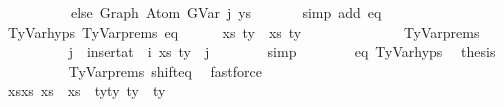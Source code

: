 \begin{isabellebody}
\ \ \ \ \ \ \ \ \ \ else\ Graph\ {\isacharparenleft}{\kern0pt}Atom\ {\isacharparenleft}{\kern0pt}GVar\ j{\isacharparenright}{\kern0pt}\ ys{\isacharparenright}{\kern0pt}{\isacharparenright}{\kern0pt}{\isachardoublequoteclose}\isanewline
\ \ \ \ \ \isamarkupfalse%
\ {\isacharparenleft}{\kern0pt}simp\ add{\isacharcolon}{\kern0pt}\ eq{\isacharparenright}{\kern0pt}\isanewline
\isanewline
\ \ \ \ \isamarkupfalse%
\ TyVar{\isachardot}{\kern0pt}hyps{\isacharparenleft}{\kern0pt}{}{\isacharparenright}{\kern0pt}\ TyVar{\isachardot}{\kern0pt}prems{\isacharparenleft}{\kern0pt}{}{\isacharparenright}{\kern0pt}\ eq\isanewline
\ \ \ \ \isamarkupfalse%
\ {\isachardoublequoteopen}{\isacharparenleft}{\kern0pt}xs{\isacharprime}{\kern0pt}{\isacharcomma}{\kern0pt}\ ty{\isacharprime}{\kern0pt}{\isacharparenright}{\kern0pt}\ {\isacharequal}{\kern0pt}\ {\isacharparenleft}{\kern0pt}xs{\isacharcomma}{\kern0pt}\ ty{}{\isacharparenright}{\kern0pt}{\isachardoublequoteclose}\isanewline
\ \ \ \ \isamarkupfalse%
\ {\isacharminus}{\kern0pt}\isanewline
\ \ \ \ \ \ \isamarkupfalse%
\ TyVar{\isachardot}{\kern0pt}prems{\isacharparenleft}{\kern0pt}{}{\isacharparenright}{\kern0pt}\isanewline
\ \ \ \ \ \ \isamarkupfalse%
\ {\isachardoublequoteopen}{\isasymGamma}\ {\isacharbang}{\kern0pt}\ j\ {\isacharequal}{\kern0pt}\ {\isacharparenleft}{\kern0pt}insert{\isacharunderscore}{\kern0pt}at\ {\isasymGamma}{}\ i\ {\isacharparenleft}{\kern0pt}xs{\isacharcomma}{\kern0pt}\ ty{}{\isacharparenright}{\kern0pt}{\isacharparenright}{\kern0pt}\ {\isacharbang}{\kern0pt}\ j{\isachardoublequoteclose}\isanewline
\ \ \ \ \ \ \isamarkupfalse%
\ simp\isanewline
\ \ \ \ \ \ \isamarkupfalse%
\ eq\ TyVar{\isachardot}{\kern0pt}hyps{\isacharparenleft}{\kern0pt}{}{\isacharparenright}{\kern0pt}\ \isamarkupfalse%
\ {\isacharquery}{\kern0pt}thesis\isanewline
\ \ \ \ \ \ \ \ \isamarkupfalse%
\ TyVar{\isachardot}{\kern0pt}prems{\isacharparenleft}{\kern0pt}{}{\isacharparenright}{\kern0pt}\ shift{\isacharunderscore}{\kern0pt}eq\ \isamarkupfalse%
\ fastforce\isanewline
\ \ \ \ \isamarkupfalse%
\isanewline
\ \ \ \ \isamarkupfalse%
\ \isamarkupfalse%
\ xs{\isacharprime}{\kern0pt}{\isacharunderscore}{\kern0pt}xs{\isacharcolon}{\kern0pt}\ {\isachardoublequoteopen}xs{\isacharprime}{\kern0pt}\ {\isacharequal}{\kern0pt}\ xs{\isachardoublequoteclose}\ \ ty{\isacharprime}{\kern0pt}{\isacharunderscore}{\kern0pt}ty{}{\isacharcolon}{\kern0pt}\ {\isachardoublequoteopen}ty{\isacharprime}{\kern0pt}\ {\isacharequal}{\kern0pt}\ ty{}{\isachardoublequoteclose}\isanewline

\end{isabellebody}

